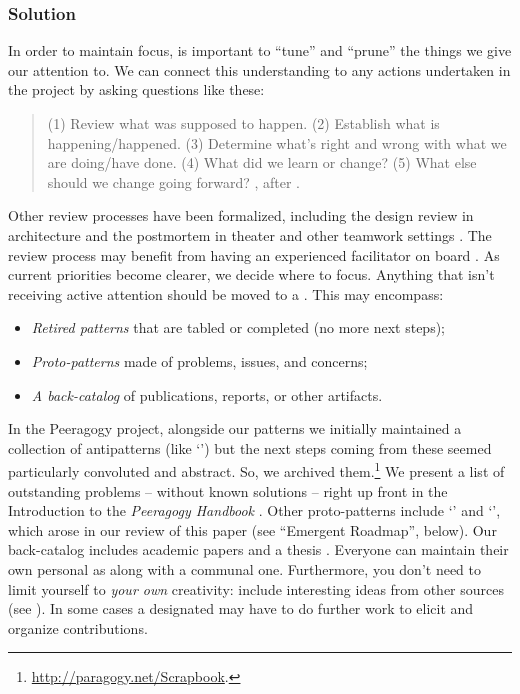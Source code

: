 \subsubsection*{Solution}
In order to maintain focus, is important to ``tune'' and ``prune'' the
things we give our attention to.  We can connect this understanding to
any actions undertaken in the project by asking questions like these:
\begin{quote}
(1) Review what was supposed to happen.
(2) Establish what is happening/happened.
(3) Determine what’s right and wrong with what we are doing/have done.
(4) What did we learn or change? 
(5) What else should we change going forward?  \cite[Chapter 28]{peeragogy-handbook}, after \cite{afteraction}.
\end{quote}
%
Other review processes have been formalized, including the design
review in architecture and the postmortem in theater and other
teamwork settings \cite{design-review,kerth2001project}.  The review
process may benefit from having an experienced facilitator on board
\cite[pp.~67, 142--143]{gabriel2002writer}.  As current priorities
become clearer, we decide where to focus.  Anything that isn't
receiving active attention should be moved to a
.  This may encompass:
\begin{itemize}
\item \emph{Retired patterns} that are tabled or completed (no more next steps);
\item \emph{Proto-patterns} made of problems, issues, and concerns;
\item \emph{A back-catalog} of publications, reports, or other
  artifacts.
\end{itemize}
In the Peeragogy project, alongside our patterns we initially
maintained a collection of antipatterns (like `') but the next steps coming from these seemed particularly
convoluted and abstract.  So, we archived
them.\footnote{\url{http://paragogy.net/Scrapbook}.}  We present a
list of outstanding problems -- without known solutions -- right up
front in the Introduction to the \emph{Peeragogy Handbook}
\cite[Chapter 1]{peeragogy-handbook}.  Other proto-patterns include
`' and `',
which arose in our review of this paper (see ``Emergent Roadmap'', below). 
Our back-catalog includes academic papers
\cite{building-peeragogy-accelerator,corneli2013inaction,corneli2012paragogical,paragogy-okcon}
and a thesis \cite{corneli-thesis}.
%
Everyone can maintain their own personal  as
along with a communal one.  Furthermore, you don't need to limit
yourself to \emph{your own} creativity: include interesting ideas from
other sources (see ). In some
cases a designated  may have to do further work
to elicit and organize contributions.

